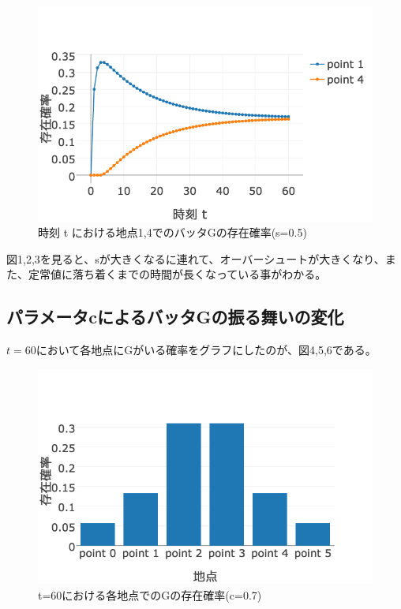 \documentclass[11pt]{ltjsarticle}
\begin{document}
	\begin{figure}
  		\includegraphics[width=\textwidth]{fig3.png}
  		\caption{時刻 t における地点1,4でのバッタGの存在確率(s=0.5)}
	\end{figure}

	図1,2,3を見ると、sが大きくなるに連れて、オーバーシュートが大きくなり、また、定常値に落ち着くまでの時間が長くなっている事がわかる。

\subsection{パラメータcによるバッタGの振る舞いの変化}
	$t=60$において各地点にGがいる確率をグラフにしたのが、図4,5,6である。

	\begin{figure}
  		\includegraphics[width=\textwidth]{fig4.png}
  		\caption{ t=60における各地点でのGの存在確率(c=0.7)}
	\end{figure}
\end{document}
